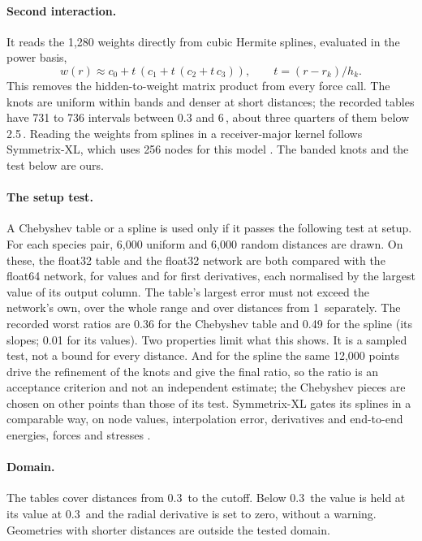 \documentclass[11pt]{article}
\newcommand{\angstrom}{\text{\AA}}
\begin{document}
\paragraph{Second interaction.}
It reads the 1{,}280 weights directly from cubic Hermite splines, evaluated in the power basis,
\begin{equation}
w(r) \approx c_0 + t\,(c_1 + t\,(c_2 + t\,c_3)), \qquad t = (r-r_k)/h_k .
\label{eq:spline}
\end{equation}
This removes the hidden-to-weight matrix product from every force call. The knots are uniform within bands and
denser at short distances; the recorded tables have 731 to 736 intervals between 0.3 and 6\,\angstrom{}, about
three quarters of them below 2.5\,\angstrom{}. Reading the weights from splines in a receiver-major kernel follows
Symmetrix-XL, which uses 256 nodes for this model \cite{fu2026symmetrixxl}. The banded knots and the test below
are ours.

\paragraph{The setup test.}
A Chebyshev table or a spline is used only if it passes the following test at setup. For each species pair,
6{,}000 uniform and 6{,}000 random distances are drawn. On these, the float32 table and the float32 network are
both compared with the float64 network, for values and for first derivatives, each normalised by the largest
value of its output column. The table's largest error must not exceed the network's own, over the whole range
and over distances from 1\,\angstrom{} separately. The recorded worst ratios are 0.36 for the Chebyshev table
and 0.49 for the spline (its slopes; 0.01 for its values). Two properties limit what this shows. It is a sampled
test, not a bound for every distance. And for the spline the same 12{,}000 points drive the refinement of the
knots and give the final ratio, so the ratio is an acceptance criterion and not an independent estimate; the
Chebyshev pieces are chosen on other points than those of its test. Symmetrix-XL gates its splines in a
comparable way, on node values, interpolation error, derivatives and end-to-end energies, forces and stresses
\cite{fu2026symmetrixxl}.

\paragraph{Domain.}
The tables cover distances from 0.3\,\angstrom{} to the cutoff. Below 0.3\,\angstrom{} the value is held at its
value at 0.3\,\angstrom{} and the radial derivative is set to zero, without a warning. Geometries with shorter
distances are outside the tested domain.
\end{document}
